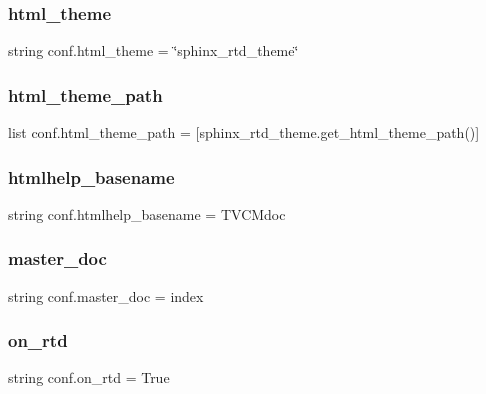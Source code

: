 \subsubsection{\texorpdfstring{html\_theme}{html\_theme}}
{\footnotesize\ttfamily string conf.\+html\+\_\+theme = \char`\"{}sphinx\+\_\+rtd\+\_\+theme\char`\"{}}

\mbox{\label{namespaceconf_a4960231f83b1b44a1ffcd212903b62e8}} 
\subsubsection{\texorpdfstring{html\_theme\_path}{html\_theme\_path}}
{\footnotesize\ttfamily list conf.\+html\+\_\+theme\+\_\+path = \mbox{[}sphinx\+\_\+rtd\+\_\+theme.\+get\+\_\+html\+\_\+theme\+\_\+path()\mbox{]}}

\mbox{\label{namespaceconf_aab7fddb2766ce3c430d8246fbfdbc7b1}} 
\subsubsection{\texorpdfstring{htmlhelp\_basename}{htmlhelp\_basename}}
{\footnotesize\ttfamily string conf.\+htmlhelp\+\_\+basename = \textquotesingle{}T\+V\+C\+Mdoc\textquotesingle{}}

\mbox{\label{namespaceconf_a6fcd7e5236f355b1e1a55f9d95988810}} 
\subsubsection{\texorpdfstring{master\_doc}{master\_doc}}
{\footnotesize\ttfamily string conf.\+master\+\_\+doc = \textquotesingle{}index\textquotesingle{}}

\mbox{\label{namespaceconf_ac9f32ab656bf05ad872fd46e03504cc8}} 
\subsubsection{\texorpdfstring{on\_rtd}{on\_rtd}}
{\footnotesize\ttfamily string conf.\+on\+\_\+rtd = \textquotesingle{}True\textquotesingle{}}


